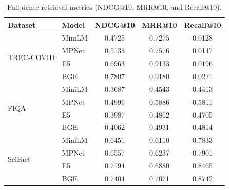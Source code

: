\documentclass[12pt, a4paper]{article}
\makeatletter
\newcommand{\ndcg}{NDCG@10}
\newcommand{\mrr}{MRR@10}
\newcommand{\tc}{TREC-COVID}
\newcommand{\fiqa}{FIQA}
\newcommand{\scifact}{SciFact}
\makeatother
\begin{document}
\begin{table}[h]
\centering
\caption{Full dense retrieval metrics (\ndcg{}, \mrr{}, and Recall@10).}
\label{tab:dense_full}
\begin{tabular}{llccc}
\toprule
\textbf{Dataset} & \textbf{Model} & \textbf{\ndcg{}} & \textbf{\mrr{}} & \textbf{Recall@10} \\
\midrule
\multirow{4}{*}{\tc{}}
  & MiniLM  & 0.4725 & 0.7275 & 0.0128 \\
  & MPNet   & 0.5133 & 0.7576 & 0.0147 \\
  & E5      & 0.6963 & 0.9133 & 0.0196 \\
  & BGE     & 0.7807 & 0.9180 & 0.0221 \\
\midrule
\multirow{4}{*}{\fiqa{}}
  & MiniLM  & 0.3687 & 0.4543 & 0.4413 \\
  & MPNet   & 0.4996 & 0.5886 & 0.5811 \\
  & E5      & 0.3987 & 0.4862 & 0.4705 \\
  & BGE     & 0.4062 & 0.4931 & 0.4814 \\
\midrule
\multirow{4}{*}{\scifact{}}
  & MiniLM  & 0.6451 & 0.6110 & 0.7833 \\
  & MPNet   & 0.6557 & 0.6237 & 0.7901 \\
  & E5      & 0.7194 & 0.6880 & 0.8465 \\
  & BGE     & 0.7404 & 0.7071 & 0.8742 \\
\bottomrule
\end{tabular}
\end{table}
\end{document}
